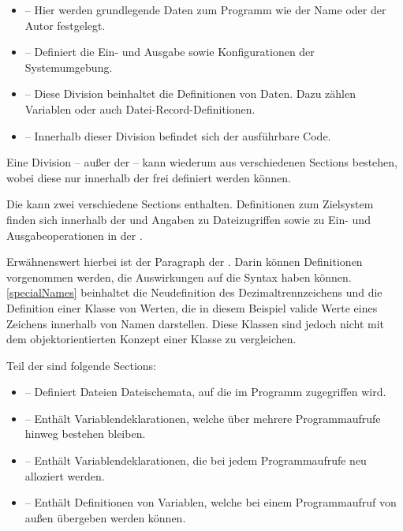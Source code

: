 \begin{itemize}
    \item {} -- Hier werden grundlegende Daten zum Programm wie der Name oder der Autor festgelegt.
    \item {} -- Definiert die Ein- und Ausgabe sowie Konfigurationen der Systemumgebung.
    \item {} -- Diese Division beinhaltet die Definitionen von Daten. Dazu zählen Variablen oder auch Datei-Record-Definitionen.
    \item {} -- Innerhalb dieser Division befindet sich der ausführbare Code.
\end{itemize}

Eine Division -- außer der  -- kann wiederum aus verschiedenen Sections bestehen, wobei diese nur innerhalb der  frei definiert werden können.

Die  kann zwei verschiedene Sections enthalten. Definitionen zum Zielsystem finden sich innerhalb der  und Angaben zu Dateizugriffen sowie zu Ein- und Ausgabeoperationen in der . 


Erwähnenswert hierbei ist der  Paragraph der . Darin können Definitionen vorgenommen werden, die \ua Auswirkungen auf die Syntax haben können. \autoref{specialNames} beinhaltet die Neudefinition des Dezimaltrennzeichens und die Definition einer Klasse von Werten, die in diesem Beispiel valide Werte eines Zeichens innerhalb von Namen darstellen. Diese Klassen sind jedoch nicht mit dem objektorientierten Konzept einer Klasse zu vergleichen. 

Teil der  sind folgende Sections:
\begin{itemize}
    \item {} -- Definiert Dateien \bzw Dateischemata, auf die im Programm zugegriffen wird.
    \item {} -- Enthält Variablendeklarationen, welche über mehrere Programmaufrufe hinweg bestehen bleiben.
    \item {} -- Enthält Variablendeklarationen, die bei jedem Programmaufrufe neu alloziert werden.
    \item {} -- Enthält Definitionen von Variablen, welche bei einem Programmaufruf von außen übergeben werden können.
\end{itemize}

